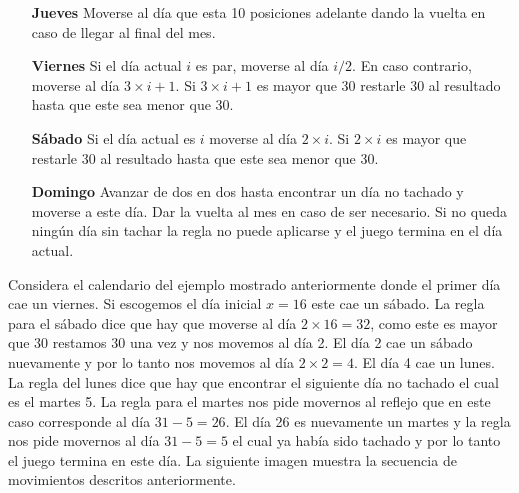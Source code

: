 \documentclass{oci}
\begin{document}
\begin{problemDescription}
\begin{itemize}
    \item[\bf Jueves] Moverse al día que esta 10 posiciones adelante dando la vuelta en caso de
    llegar al final del mes.

    \item[\bf Viernes] Si el día actual $i$ es par, moverse al día $i/2$.
    En caso contrario, moverse al día $3\times i + 1$.
    Si $3\times i + 1$ es mayor que 30 restarle 30 al resultado hasta que este sea menor que 30.

    \item[\bf Sábado] Si el día actual es $i$ moverse al día $2\times i$.
    Si $2\times i$ es mayor que restarle 30 al resultado hasta que este sea menor que 30.

    \item[\bf Domingo] Avanzar de dos en dos hasta encontrar un día no tachado y moverse a este día.
    Dar la vuelta al mes en caso de ser necesario.
    Si no queda ningún día sin tachar la regla no puede aplicarse y el juego termina en el día actual.
  \end{itemize}

  Considera el calendario del ejemplo mostrado anteriormente donde el primer día cae un viernes.
  Si escogemos el día inicial $x=16$ este cae un sábado.
  La regla para el sábado dice que hay que moverse al día $2\times 16 = 32$, como este es mayor que 30
  restamos 30 una vez y nos movemos al día 2.
  El día 2 cae un sábado nuevamente y por lo tanto nos movemos al día $2\times 2=4$.
  El día 4 cae un lunes.
  La regla del lunes dice que hay que encontrar el siguiente día no tachado el cual es el martes 5.
  La regla para el martes nos pide movernos al reflejo que en este caso corresponde al día $31 - 5 = 26$.
  El día 26 es nuevamente un martes y la regla nos pide movernos al día $31 - 5 = 5$ el cual ya había
  sido tachado y por lo tanto el juego termina en este día.
  La siguiente imagen muestra la secuencia de movimientos descritos anteriormente.


\end{problemDescription}
\end{document}
